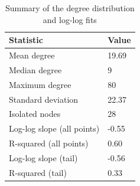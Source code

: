 \begin{table}[!ht]
\centering
\caption{Summary of the degree distribution and log-log fits}
\label{tab:degree}
\begin{tabular}{ll}
\toprule
Statistic & Value \\
\midrule
Mean degree & 19.69 \\
Median degree & 9 \\
Maximum degree & 80 \\
Standard deviation & 22.37 \\
Isolated nodes & 28 \\
Log-log slope (all points) & -0.55 \\
R-squared (all points) & 0.60 \\
Log-log slope (tail) & -0.56 \\
R-squared (tail) & 0.33 \\
\bottomrule
\end{tabular}
\end{table}
